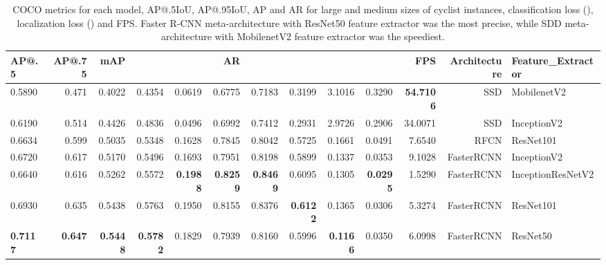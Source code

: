 \documentclass[journal]{IEEEtran}
\begin{document}
\begin{table*}[hb!]
\begin{minipage}[c]{0.95\textwidth}
\caption{COCO metrics for each model, AP@.5IoU, AP@.95IoU, AP and AR for large and medium sizes of cyclist instances, classification loss (), localization loss () and FPS. Faster R-CNN meta-architecture with ResNet50 feature extractor was the most precise, while SDD meta-architecture with MobilenetV2 feature extractor was the speediest.
\label{table:Cyclist_Orientation_mAP}}
\end{minipage}
\addtolength{\tabcolsep}{-1pt}
\begin{center}
\begin{tabular}{|lrrrrrrrrrrrl|}
\toprule
AP@.5 &  AP@.75 &     mAP &    &    &      AR &      &      &   &  &    FPS & Architecture &  Feature\_Extractor \\
\toprule
\midrule
0.5890 &  0.471 &  0.4022 &  0.4354 &  0.0619 &  0.6775 &  0.7183 &  0.3199 &     3.1016 &    0.3290 &  \textbf{54.7106} &          SSD &        MobilenetV2 \\
0.6190 &  0.514 &  0.4426 &  0.4836 &  0.0496 &  0.6992 &  0.7412 &  0.2931 &     2.9726 &    0.2906 &  34.0071 &          SSD &        InceptionV2 \\
0.6634 &  0.599 &  0.5035 &  0.5348 &  0.1628 &  0.7845 &  0.8042 &  0.5725 &     0.1661 &    0.0491 &   7.6540 &         RFCN &          ResNet101 \\
0.6720 &  0.617 &  0.5170 &  0.5496 &  0.1693 &  0.7951 &  0.8198 &  0.5899 &     0.1337 &    0.0353 &   9.1028 &   FasterRCNN &        InceptionV2 \\
0.6640 &  0.616 &  0.5262 &  0.5572 &  \textbf{0.1988} &  \textbf{0.8259}&  \textbf{0.8469} &  0.6095 &     0.1305 &    \textbf{0.0295} &   1.5290 &   FasterRCNN &  InceptionResNetV2 \\
0.6930 &  0.635 &  0.5438 &  0.5763 &  0.1950 &  0.8155 &  0.8376 &  \textbf{0.6122} &     0.1365 &    0.0306 &   5.3274 &   FasterRCNN &          ResNet101 \\
\textbf{0.7117} & \textbf{ 0.647} &  \textbf{0.5448} &  \textbf{0.5782} &  0.1829 &  0.7939 &  0.8160 &  0.5996 &     \textbf{0.1166} &    0.0350 &   6.0998 &   FasterRCNN &           ResNet50 \\
\bottomrule
\end{tabular}
\end{center}
\end{table*}
\end{document}
